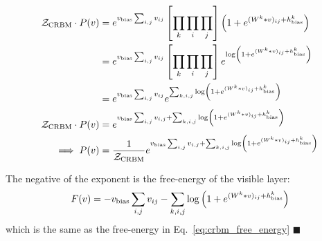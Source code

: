 \documentclass[12pt]{article}
\newcommand{\Eqref}[1]{Eq.~\eqref{#1}}
\begin{document}
\begin{align}
 \mathcal{Z}_{\rm{CRBM}} \cdot P(v) &=  e^{v_{\rm{bias}} \sum_{i,j} v_{ij}} \left [ \prod_{k} \prod_{i} \prod_{j} \right ] \left (1+ e^{(W^k * v)_{ij} + h_{\rm{bias}}^k} \right ) \nonumber \\
 &= e^{v_{\rm{bias}} \sum_{i,j} v_{ij}} \left [ \prod_{k} \prod_{i} \prod_{j} \right ] e^{\log \left (1+ e^{(W^k * v)_{ij} + h_{\rm{bias}}^k} \right)} \nonumber \\
 &= e^{v_{\rm{bias}} \sum_{i,j} v_{ij}} e^{\sum_{k,i,j} \log \left (1+ e^{(W^k * v)_{ij} + h_{\rm{bias}}^k} \right)} \nonumber \\
 \mathcal{Z}_{\rm{CRBM}} \cdot P(v) &= e^{ v_{\rm{bias}} \sum_{i,j} v_{i,j} + \sum_{k,i,j} \log \left (1+ e^{(W^k * v)_{ij} + h_{\rm{bias}}^k} \right)} \nonumber \\
 \implies P(v) &= \frac{1}{\mathcal{Z}_{\rm{CRBM}}}e^{ v_{\rm{bias}} \sum_{i,j} v_{i,j} + \sum_{k,i,j} \log \left (1+ e^{(W^k * v)_{ij} + h_{\rm{bias}}^k} \right)} 
\end{align}
%

The negative of the exponent is the free-energy of the visible layer:
%
\begin{equation}
F(v) =  - v_{\rm{bias}} \sum_{i,j} v_{ij} - \sum_{k,i,j} \log \left (1+ e^{(W^k * v)_{ij} + h_{\rm{bias}}^k} \right)
\end{equation}
%
which is the same as the free-energy in \Eqref{eq:crbm_free_energy} $\blacksquare$






\end{document}
